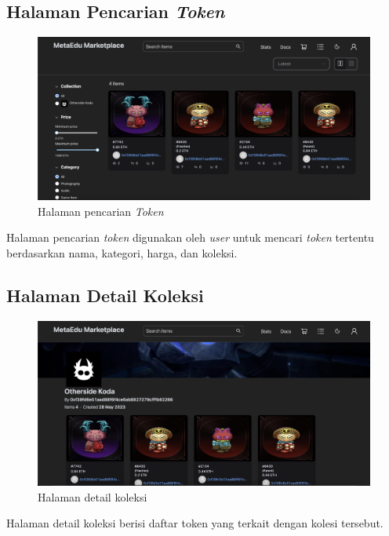 \subsection{Halaman Pencarian \emph{Token}}
\begin{figure} [H] \centering
  \includegraphics[scale=0.3]{gambar/img-frontend-search.png}
  \caption{Halaman pencarian \emph{Token}}
  \label{fig:TokenSearch}
\end{figure}

Halaman pencarian \emph{token} digunakan oleh \emph{user} untuk mencari \emph{token} tertentu berdasarkan nama, kategori, harga, dan koleksi.

\subsection{Halaman Detail Koleksi}
\begin{figure} [H] \centering
  \includegraphics[scale=0.3]{gambar/img-frontend-collection.png}
  \caption{Halaman detail koleksi}
  \label{fig:CollectionDetail}
\end{figure}

Halaman detail koleksi berisi daftar token yang terkait dengan kolesi tersebut.

